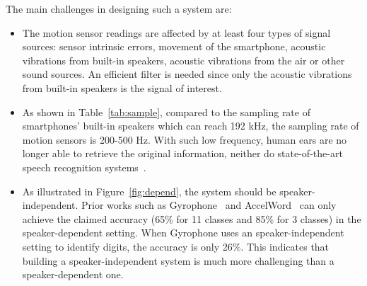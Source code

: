 The main challenges in designing such a system are:
 \begin{itemize}
 	\item  The motion sensor readings are affected by at least four types of signal sources: sensor intrinsic errors, movement of the smartphone, acoustic vibrations from built-in speakers, acoustic vibrations from the air or other sound sources. An efficient filter is needed since only the acoustic vibrations from built-in speakers is the signal of interest.
 	
 	\item As shown in Table~\ref{tab:sample}, compared to the sampling rate of smartphones' built-in speakers which can reach 192 kHz, the sampling rate of motion sensors is 200-500 Hz. With such low frequency, human ears are no longer able to retrieve the original information, neither do state-of-the-art speech recognition systems~\cite{michalevsky2014gyrophone}.
 	
 	\item As illustrated in Figure~\ref{fig:depend}, the system should be speaker-independent. Prior works such as  Gyrophone~\cite{michalevsky2014gyrophone} and AccelWord~\cite{zhang2015accelword} can only achieve the claimed accuracy (65\% for 11 classes and 85\% for 3 classes) in the speaker-dependent setting. When Gyrophone uses an speaker-independent setting to identify digits, the
 	accuracy is only 26\%. This indicates that building a speaker-independent system is much more challenging than a speaker-dependent one.
 	
 \end{itemize}

%
%
%


